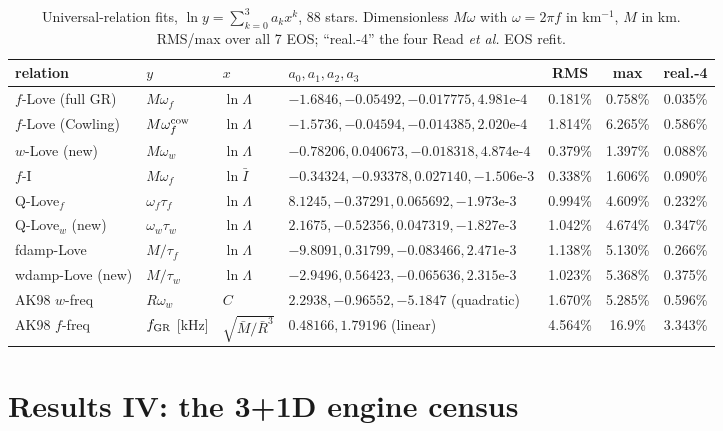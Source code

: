 \documentclass[aps,prd,preprint,amsmath,amssymb,nofootinbib,longbibliography]{revtex4-2}
\begin{document}
\begin{table}[htbp]
\caption{Universal-relation fits, $\ln y = \sum_{k=0}^{3}a_k x^k$, 88 stars. Dimensionless
$M\omega$ with $\omega = 2\pi f$ in km$^{-1}$, $M$ in km. RMS/max over all 7 EOS; ``real.-4'' the
four Read \emph{et al.} EOS refit.}
\label{tab:fits}
\footnotesize
\begin{ruledtabular}
\begin{tabular}{llllccc}
relation & $y$ & $x$ & $a_0, a_1, a_2, a_3$ & RMS & max & real.-4\\
\hline
$f$-Love (full GR) & $M\omega_f$ & $\ln\Lambda$ & $-1.6846, -0.05492, -0.017775, 4.981\text{e-}4$ & 0.181\% & 0.758\% & 0.035\%\\
$f$-Love (Cowling) & $M\omega_f^{\rm cow}$ & $\ln\Lambda$ & $-1.5736, -0.04594, -0.014385, 2.020\text{e-}4$ & 1.814\% & 6.265\% & 0.586\%\\
$w$-Love (new) & $M\omega_w$ & $\ln\Lambda$ & $-0.78206, 0.040673, -0.018318, 4.874\text{e-}4$ & 0.379\% & 1.397\% & 0.088\%\\
$f$-I & $M\omega_f$ & $\ln\bar I$ & $-0.34324, -0.93378, 0.027140, -1.506\text{e-}3$ & 0.338\% & 1.606\% & 0.090\%\\
Q-Love$_f$ & $\omega_f\tau_f$ & $\ln\Lambda$ & $8.1245, -0.37291, 0.065692, -1.973\text{e-}3$ & 0.994\% & 4.609\% & 0.232\%\\
Q-Love$_w$ (new) & $\omega_w\tau_w$ & $\ln\Lambda$ & $2.1675, -0.52356, 0.047319, -1.827\text{e-}3$ & 1.042\% & 4.674\% & 0.347\%\\
fdamp-Love & $M/\tau_f$ & $\ln\Lambda$ & $-9.8091, 0.31799, -0.083466, 2.471\text{e-}3$ & 1.138\% & 5.130\% & 0.266\%\\
wdamp-Love (new) & $M/\tau_w$ & $\ln\Lambda$ & $-2.9496, 0.56423, -0.065636, 2.315\text{e-}3$ & 1.023\% & 5.368\% & 0.375\%\\
AK98 $w$-freq & $R\omega_w$ & $C$ & $2.2938, -0.96552, -5.1847$ (quadratic) & 1.670\% & 5.285\% & 0.596\%\\
AK98 $f$-freq & $f_{\rm GR}$ [kHz] & $\sqrt{\bar M/\bar R^3}$ & $0.48166, 1.79196$ (linear) & 4.564\% & 16.9\% & 3.343\%\\
\end{tabular}
\end{ruledtabular}
\end{table}

\section{Results IV: the 3+1D engine census}
\label{sec:3d}
\end{document}
